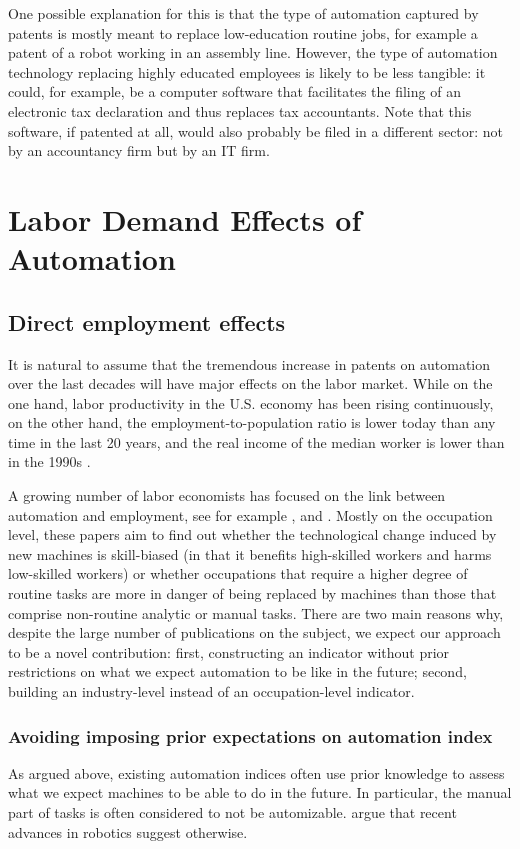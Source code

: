 \documentclass[11pt,a4paper,fleqn]{article}
\begin{document}
One possible explanation for this is that the type of automation captured by patents is mostly meant to replace low-education routine jobs, for example a patent of a robot working in an assembly line. However, the type of automation technology replacing highly educated employees is likely to be less tangible: it could, for example, be a computer software that facilitates the filing of an electronic tax declaration and thus replaces tax accountants. Note that this software, if patented at all, would also probably be filed in a different sector: not by an accountancy firm but by an IT firm.



\section{Labor Demand Effects of Automation}

\subsection{Direct employment effects}
It is natural to assume that the tremendous increase in patents on automation over the last decades will have major effects on the labor market. While on the one hand, labor productivity in the U.S. economy has been rising continuously, on the other hand, the employment-to-population ratio is lower today than any time in the last 20 years, and the real income of the median worker is lower than in the 1990s \citep[p.~164]{BM2014}. 

A growing number of labor economists has focused on the link between automation and employment, see for example \cite{ALM2003}, \cite{GM2007} and \cite{AKK2008}. Mostly on the occupation level, these papers aim to find out whether the technological change induced by new machines is skill-biased (in that it benefits high-skilled workers and harms low-skilled workers) or whether occupations that require a higher degree of routine tasks are more in danger of being replaced by machines than those that comprise non-routine analytic or manual tasks. There are two main reasons why, despite the large number of publications on the subject, we expect our approach to be a novel contribution: first, constructing an indicator without prior restrictions on what we expect automation to be like in the future; second, building an industry-level instead of an occupation-level indicator.

\subsubsection*{Avoiding imposing prior expectations on automation index}
As argued above, existing automation indices often use prior knowledge to assess what we expect machines to be able to do in the future. In particular, the manual part of tasks is often considered to not be automizable. \cite{BM2014} argue that recent advances in robotics suggest otherwise. 
\end{document}

